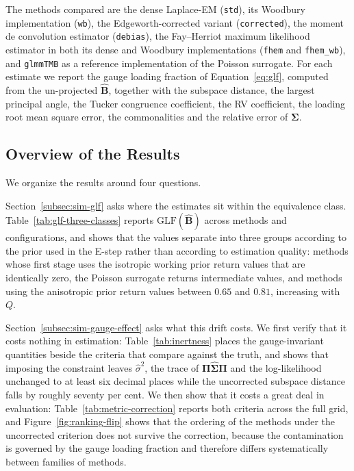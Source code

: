 The methods compared are the dense Laplace-EM (\texttt{std}), its Woodbury implementation (\texttt{wb}), the Edgeworth-corrected variant (\texttt{corrected}), the moment de convolution estimator (\texttt{debias}), the Fay--Herriot maximum likelihood estimator in both its dense and Woodbury implementations (\texttt{fhem} and \texttt{fhem\_wb}), and \texttt{glmmTMB} as a reference implementation of the Poisson surrogate. For each estimate we report the gauge loading fraction of Equation~\eqref{eq:glf}, computed from the un-projected $\hat{\mathbf{B}}$, together with the subspace distance, the largest principal angle, the Tucker congruence coefficient, the RV coefficient, the loading root mean square error, the commonalities and the relative error of $\bm{\Sigma}$.

\subsection{Overview of the Results}
\label{subsec:sim-overview}

We organize the results around four questions.

Section~\ref{subsec:sim-glf} asks where the estimates sit within the equivalence class. Table~\ref{tab:glf-three-classes} reports $\mathrm{GLF}(\hat{\mathbf{B}})$ across methods and configurations, and shows that the values separate into three groups according to the prior used in the E-step rather than according to estimation quality: methods whose first stage uses the isotropic working prior return values that are identically zero, the Poisson surrogate returns intermediate values, and methods using the anisotropic prior return values between $0.65$ and $0.81$, increasing with $Q$.

Section~\ref{subsec:sim-gauge-effect} asks what this drift costs. We first verify that it costs nothing in estimation: Table~\ref{tab:inertness} places the gauge-invariant quantities beside the criteria that compare against the truth, and shows that imposing the constraint leaves $\hat\sigma^{2}$, the trace of $\bm{\Pi}\hat{\bm{\Sigma}}\bm{\Pi}$ and the log-likelihood unchanged to at least six decimal places while the uncorrected subspace distance falls by roughly seventy per cent. We then show that it costs a great deal in evaluation: Table~\ref{tab:metric-correction} reports both criteria across the full grid, and Figure~\ref{fig:ranking-flip} shows that the ordering of the methods under the uncorrected criterion does not survive the correction, because the contamination is governed by the gauge loading fraction and therefore differs systematically between families of methods.

